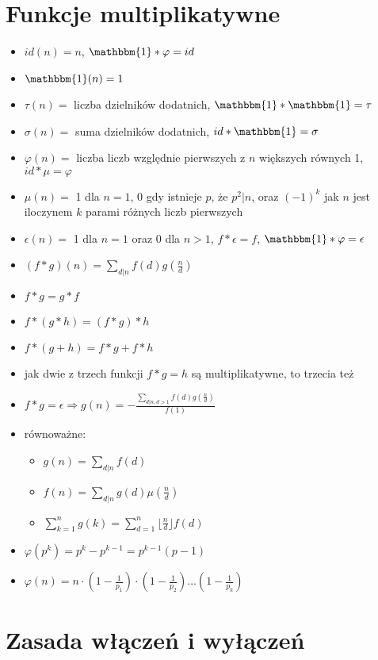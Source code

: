 \section{Funkcje multiplikatywne}
		\begin{itemize}[noitemsep]
			\item $id(n)=n$, $\mathbbm{1} \ast \varphi = id$
			\item $\mathbbm{1}(n)=1$
			\item $\tau(n)=$ liczba dzielników dodatnich, $\mathbbm{1} \ast \mathbbm{1} = \tau$
			\item $\sigma(n)=$ suma dzielników dodatnich, $id \ast \mathbbm{1} = \sigma$
			\item $\varphi(n)=$ liczba liczb względnie pierwszych z $n$ większych równych 1, $id \ast \mu = \varphi$
			\item $\mu(n)=$ 1 dla $n=1$, 0 gdy istnieje $p$, że $p^2 | n$, oraz $(-1)^k$ jak $n$ jest iloczynem $k$ parami różnych liczb pierwszych
			\item $\epsilon(n)=$ 1 dla $n=1$ oraz 0 dla $n>1$, $f \ast \epsilon = f$, $\mathbbm{1} \ast \varphi = \epsilon$
			\item $(f \ast g)(n)=\sum_{d|n}f(d)g(\frac{n}{d})$
			\item $f \ast g = g \ast f$
			\item $f \ast (g \ast h) = (f \ast g) \ast h$
			\item $f \ast (g+h) = f \ast g + f \ast h$
			\item jak dwie z trzech funkcji $f \ast g = h$ są multiplikatywne, to trzecia też
			\item $f \ast g = \epsilon \Rightarrow g(n) = -\frac{\sum_{d|n,d>1} f(d) g(\frac{n}{d})}{f(1)}$
			\item równoważne:
			\begin{itemize}
				\item $g(n) = \sum_{d|n} f(d)$
				\item $f(n) = \sum_{d|n} g(d) \mu(\frac{n}{d})$
				\item $\sum_{k=1}^n g(k) = \sum_{d=1}^n \lfloor \frac{n}{d} \rfloor f(d)$
			\end{itemize}
			\item $\varphi(p^k) = p^k - p^{k-1} = p^{k-1}(p-1)$
			\item $\varphi(n) = n \cdot (1 - \frac{1}{p_1}) \cdot (1 - \frac{1}{p_2}) \dots (1 - \frac{1}{p_k})$
		\end{itemize}

\section{Zasada włączeń i wyłączeń}

